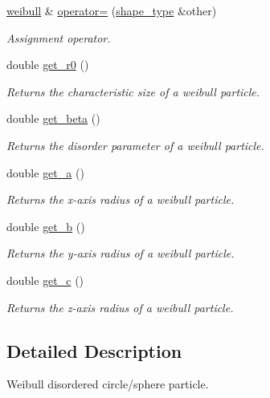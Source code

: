 \begin{DoxyCompactItemize}
\hyperlink{classparticle_1_1weibull}{weibull} \& \hyperlink{classparticle_1_1weibull_a0610e2d9bdf603f9f59be9d6130fef52}{operator=} (\hyperlink{classparticle_1_1shape__type}{shape\+\_\+type} \&other)
\begin{DoxyCompactList}\small\item\em Assignment operator. \end{DoxyCompactList}\item 
double \hyperlink{classparticle_1_1weibull_a066ae2328d6e4b55b43eb52f53b43baf}{get\+\_\+r0} ()
\begin{DoxyCompactList}\small\item\em Returns the characteristic size of a weibull particle. \end{DoxyCompactList}\item 
double \hyperlink{classparticle_1_1weibull_af8e951c92b61168be9457cba71b3c7c3}{get\+\_\+beta} ()
\begin{DoxyCompactList}\small\item\em Returns the disorder parameter of a weibull particle. \end{DoxyCompactList}\item 
double \hyperlink{classparticle_1_1weibull_a41248e21e9902e83ea14f6e8dd6c6405}{get\+\_\+a} ()
\begin{DoxyCompactList}\small\item\em Returns the x-\/axis radius of a weibull particle. \end{DoxyCompactList}\item 
double \hyperlink{classparticle_1_1weibull_af6a1bd186cd00d144740d10d67302c26}{get\+\_\+b} ()
\begin{DoxyCompactList}\small\item\em Returns the y-\/axis radius of a weibull particle. \end{DoxyCompactList}\item 
double \hyperlink{classparticle_1_1weibull_a5bbf1a465bfcddd7256a0128ad66d025}{get\+\_\+c} ()
\begin{DoxyCompactList}\small\item\em Returns the z-\/axis radius of a weibull particle. \end{DoxyCompactList}\end{DoxyCompactItemize}


\subsection{Detailed Description}
Weibull disordered circle/sphere particle. 

